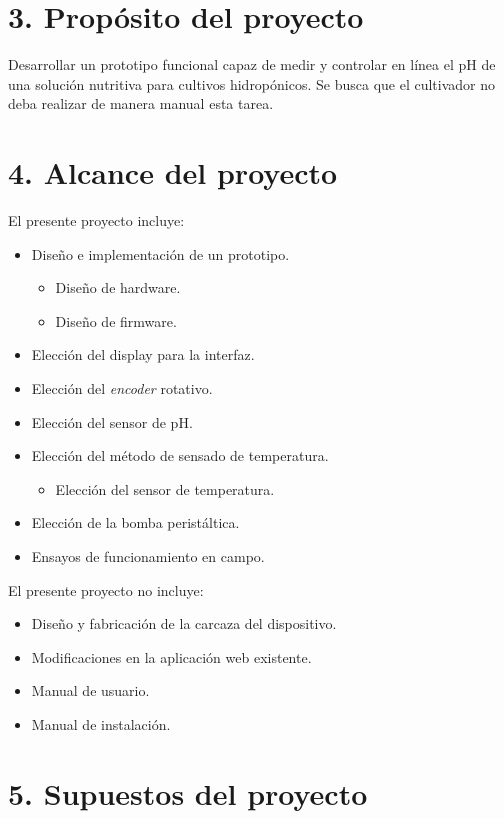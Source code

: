 \documentclass[
11pt, %
codirector, %
]{charter}
\begin{document}
\section{3. Propósito del proyecto}
\label{sec:proposito}

Desarrollar un prototipo funcional capaz de medir y controlar en línea el pH de una solución nutritiva para cultivos hidropónicos. Se busca que el cultivador no deba realizar de manera manual esta tarea.

\section{4. Alcance del proyecto}
\label{sec:alcance}

El presente proyecto incluye:
\begin{itemize}
	\item Diseño e implementación de un prototipo.
		\begin{itemize}
		\item Diseño de hardware.
		\item Diseño de firmware.
		\end{itemize}
	\item Elección del display para la interfaz.
	\item Elección del \textit{encoder} rotativo.
	\item Elección del sensor de pH.
	\item Elección del método de sensado de temperatura.
		\begin{itemize}
		\item Elección del sensor de temperatura.
		\end{itemize}
	\item Elección de la bomba peristáltica.
	\item Ensayos de funcionamiento en campo.
\end{itemize}

El presente proyecto no incluye:
\begin{itemize}
	\item Diseño y fabricación de la carcaza del dispositivo.
	\item Modificaciones en la aplicación web existente.
	\item Manual de usuario.
	\item Manual de instalación.
\end{itemize}


\section{5. Supuestos del proyecto}
\label{sec:supuestos}
\end{document}
